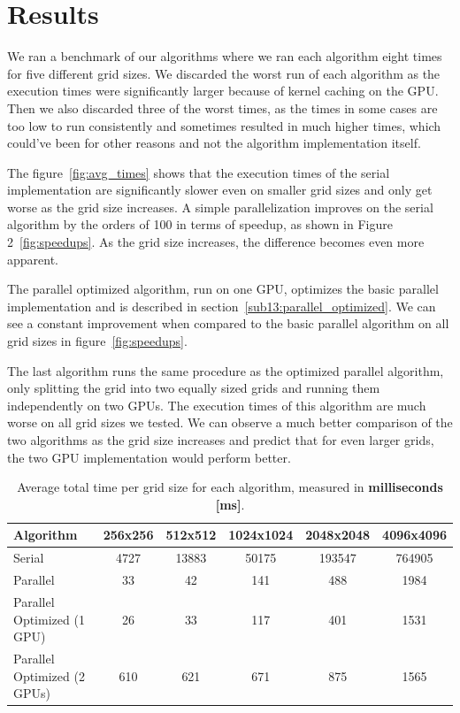 \documentclass{article}
\begin{document}
\section{Results}
We ran a benchmark of our algorithms where we ran each algorithm eight times for five different grid sizes. We discarded the worst run of each algorithm as the execution times were significantly larger because of kernel caching on the GPU. Then we also discarded three of the worst times, as the times in some cases are too low to run consistently and sometimes resulted in much higher times, which could’ve been for other reasons and not the algorithm implementation itself.

The figure~\ref{fig:avg_times} shows that the execution times of the serial implementation are significantly slower even on smaller grid sizes and only get worse as the grid size increases. A simple parallelization improves on the serial algorithm by the orders of 100 in terms of speedup, as shown in Figure 2~\ref{fig:speedups}. As the grid size increases, the difference becomes even more apparent.

The parallel optimized algorithm, run on one GPU, optimizes the basic parallel implementation and is described in section~\ref{sub13:parallel_optimized}. We can see a constant improvement when compared to the basic parallel algorithm on all grid sizes in figure~\ref{fig:speedups}. 

The last algorithm runs the same procedure as the optimized parallel algorithm, only splitting the grid into two equally sized grids and running them independently on two GPUs. The execution times of this algorithm are much worse on all grid sizes we tested. We can observe a much better comparison of the two algorithms as the grid size increases and predict that for even larger grids, the two GPU implementation would perform better.

\begin{table}[H]
    \centering
    \begin{tabular}{| l || c | c | c | c | c |}
        \hline
        Algorithm & 256x256 & 512x512 & 1024x1024 & 2048x2048 & 4096x4096 \\
        \hline
        Serial & 4727 & 13883 & 50175 & 193547 & 764905 \\
        Parallel & 33 & 42 & 141 & 488 & 1984 \\
        Parallel Optimized (1 GPU) & 26 & 33 & 117 & 401 & 1531 \\
        Parallel Optimized (2 GPUs) & 610 & 621 & 671 & 875 & 1565 \\
        \hline
    \end{tabular}
    \caption{Average total time per grid size for each algorithm, measured in \textbf{milliseconds [ms]}.}
    \label{tbl:avg_times}
\end{table}
\end{document}
